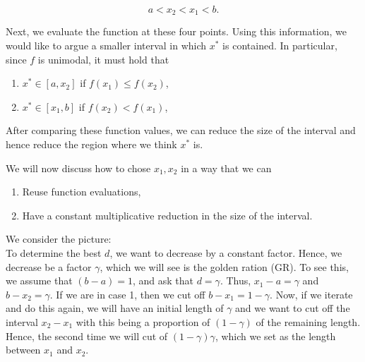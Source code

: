 $$
a < x_2 < x_1 < b.
$$

Next, we evaluate the function at these four points.  Using this information, we would like to argue a smaller interval in which $x^*$ is contained.  In particular, since $f$ is unimodal, it must hold that 
\begin{enumerate}
\item $x^* \in [a, x_2]$ if  $f(x_1) \leq f(x_2)$, 
\item $x^* \in [x_1,b]$ if $f(x_2) < f(x_1)$,
\end{enumerate}


After comparing these function values, we can reduce the size of the interval and hence reduce the region where we think $x^*$ is.   


We will now discuss how to chose $x_1,x_2$ in a way that we can 
\begin{enumerate}
\item Reuse function evaluations,
\item Have a constant multiplicative reduction in the size of the interval.
\end{enumerate}


We consider the picture:\\

To determine the best $d$, we want to decrease by a constant factor.  Hence, we decrease be a factor $\gamma$, which we will see is the golden ration (GR).  To see this, we assume that $(b-a) = 1$, and ask that $d = \gamma$.  Thus, $x_1 - a = \gamma$ and $b - x_2 = \gamma$.  If we are in case 1, then we cut off $b-x_1 = 1-\gamma$.  Now, if we iterate and do this again, we will have an initial length of $\gamma$ and we want to cut off the interval $x_2 - x_1$ with this being a proportion of $(1-\gamma)$ of the remaining length.  Hence, the second time we will cut of $(1-\gamma)\gamma$, which we set as the length between $x_1$ and $x_2$.  

